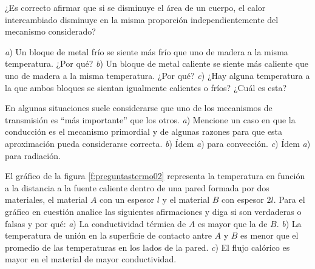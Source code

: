 %
\begin{center}
\end{center}
%
\begin{Exercise}
  ¿Es correcto afirmar que si se disminuye el área de un cuerpo, el calor intercambiado disminuye en la misma proporción independientemente del mecanismo considerado?
\end{Exercise}
%
\begin{Exercise}
  \textit{a}) Un bloque de metal frío se siente más frío que uno de madera a la misma temperatura. ¿Por qué? \textit{b}) Un bloque de metal caliente se siente más caliente que uno de madera a la misma temperatura. ¿Por qué? \textit{c}) ¿Hay alguna temperatura a la que ambos bloques se sientan igualmente calientes o fríos? ¿Cuál es esta?
\end{Exercise}
%
\begin{Exercise}
  En algunas situaciones suele considerarse que uno de los mecanismos de transmisión es ``más importante'' que los otros. \textit{a}) Mencione un caso en que la conducción es el mecanismo primordial y de algunas razones para que esta aproximación pueda considerarse correcta. \textit{b}) Ídem \textit{a}) para convección. \textit{c}) Ídem \textit{a}) para radiación.
\end{Exercise}
%
\begin{Exercise}\label{p:preguntastermo02}
El gráfico de la figura \ref{f:preguntastermo02} representa la temperatura en función a la distancia a la fuente caliente dentro de una pared formada por dos materiales, el material $A$ con un espesor $l$ y el material $B$ con espesor $2l$. Para el gráfico en cuestión analice las siguientes afirmaciones y diga si son verdaderas o falsas y por qué: \textit{a}) La conductividad térmica de $A$ es mayor que la de $B$. \textit{b}) La temperatura de unión en la superficie de contacto antre $A$ y $B$ es menor que el promedio de las temperaturas en los lados de la pared. \textit{c}) El flujo calórico es mayor en el material de mayor conductividad.
\end{Exercise}
